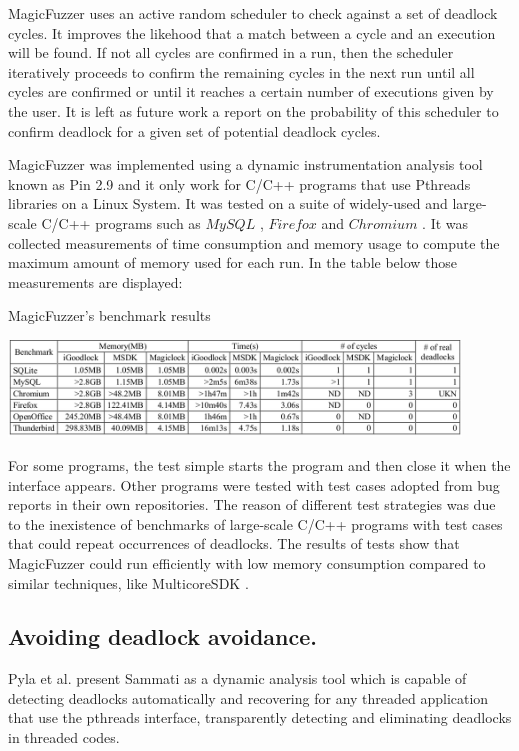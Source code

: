 MagicFuzzer uses an active random scheduler to check against a set of deadlock cycles. It improves the likehood that a match between a cycle and an execution will be found.
If not all cycles are confirmed in a run, then the scheduler iteratively proceeds to confirm the remaining cycles in the next run until all cycles are confirmed or until it
reaches a certain number of executions given by the user. It is left as future work a report on the probability of this scheduler to confirm deadlock for a given set of potential deadlock cycles.

MagicFuzzer was implemented using a dynamic instrumentation analysis tool known as Pin 2.9 \cite{pin} and it only work for C/C++ programs that use Pthreads libraries on a Linux System.
It was tested on a suite of widely-used and large-scale C/C++ programs such as $MySQL$ \cite{mysql}, $Firefox$ \cite{firefox} and $Chromium$ \cite{chromium}.
It was collected measurements of time consumption and memory usage to compute the maximum amount of memory used for each run. In the table below those measurements are displayed:

\begin{table}
\caption{MagicFuzzer's benchmark results}
\vspace{0 cm}
\centering
\includegraphics[width=12cm]{img/magicfuzzerbenchmark.png}
\end{table}


For some programs, the test simple starts the program and then close it when the interface appears. Other programs were tested with test cases adopted from bug reports in their own repositories. The reason of different test strategies was
due to the inexistence of benchmarks of large-scale C/C++ programs with test cases that could repeat occurrences of deadlocks.
The results of tests show that MagicFuzzer could run efficiently with low memory consumption compared to similar techniques, like MulticoreSDK \cite{mcsdk}.

\subsection{Avoiding deadlock avoidance.} Pyla et al. \cite{sammati}
present Sammati as a dynamic analysis tool which is capable of detecting deadlocks automatically and recovering for any threaded application that use the pthreads interface,
transparently detecting and eliminating deadlocks in threaded codes.

